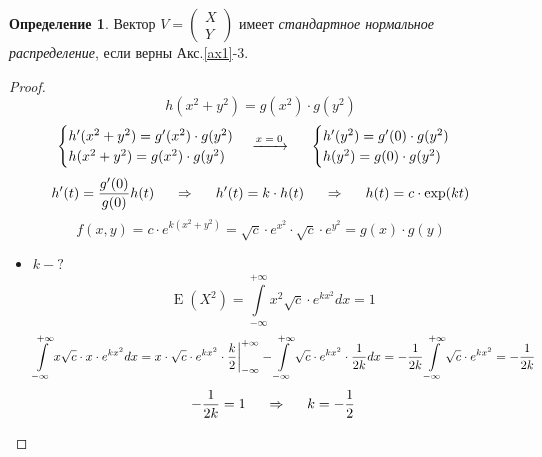 \documentclass[12pt]{article} %
\theoremstyle{definition} %
\DeclareMathOperator{\E}{E}
\begin{document}
\newtheorem*{define}{Определение}
\begin{define}
Вектор $ V = \begin{pmatrix} X \\ Y \end{pmatrix}$ имеет \emph{стандартное нормальное распределение}, если верны Акс.\ref{ax1}-3. 
\end{define}

\begin{proof}
    \[
        h(x^2+y^2) = g(x^2) \cdot g(y^2)
    \]
    \[
        \begin{cases}
            h'(x^2+y^2) = g'(x^2) \cdot g(y^2)\\
            h(x^2+y^2) = g(x^2) \cdot g(y^2)
        \end{cases}
        \xrightarrow{\text{$x=0$}} \hspace{0.5cm}
        \begin{cases}
            h'(y^2) = g'(0) \cdot g(y^2)\\
            h(y^2) = g(0) \cdot g(y^2)
        \end{cases}
    \]
    \[
        h'(t) = \frac{g'(0)}{g(0)}h(t)
        \hspace{0.5cm} \Rightarrow \hspace{0.5cm}
        h'(t) = k \cdot h(t) 
        \hspace{0.5cm} \Rightarrow \hspace{0.5cm} 
        h(t)=c \cdot \exp(kt)
    \]
    \[
        f(x,y) = c \cdot e^{k(x^2+y^2)} = \sqrt{c} \cdot e^{x^2} \cdot \sqrt{c} \cdot e^{y^2} = g(x) \cdot g(y)
    \]
    
    \begin{itemize}[label={$\bullet$}]
        \item $k - ?$
            \[
            \E(X^2) = \int\limits_{-\infty}^{+\infty} x^2 \sqrt{c} \cdot e^{kx^2} dx = 1
            \]
            \[
             \int\limits_{-\infty}^{+\infty} x \sqrt{c} \cdot x \cdot e^{kx^2} dx = x \cdot \sqrt{c} \cdot e^{kx^2} \cdot \frac{k}{2} \bigg\vert_{-\infty}^{+\infty} - \int\limits_{-\infty}^{+\infty} \sqrt{c} \cdot e^{kx^2} \cdot \frac{1}{2k} dx = - \frac{1}{2k} \int\limits_{-\infty}^{+\infty} \sqrt{c} \cdot e^{kx^2} = - \frac{1}{2k} \\
            \]
            \[
            - \frac{1}{2k} = 1  \hspace{0.5cm} \Rightarrow \hspace{0.5cm} 
            k = - \frac{1}{2}
            \]
    

\end{itemize}
\end{proof}
\end{document}
